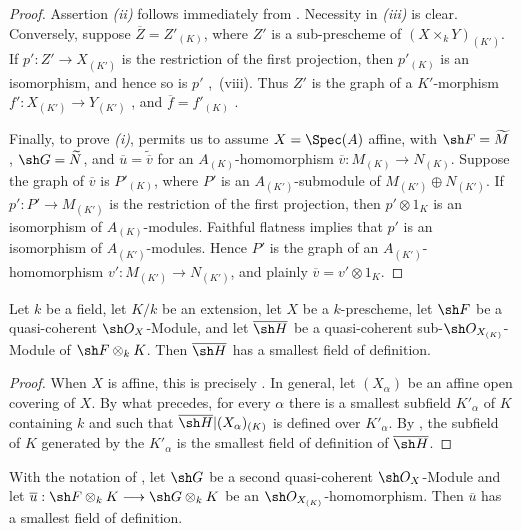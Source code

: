 \begin{proof}
Assertion \emph{(ii)} follows immediately from .
Necessity in \emph{(iii)} is clear.
Conversely, suppose
$\overline Z=Z'_{(K)}$, where $Z'$ is a sub-prescheme of
$(X\times_kY)_{(K')}$.
If $p':Z'\to X_{(K')}$ is the restriction of the first projection,
then $p'_{(K)}$ is an isomorphism, and hence so is $p'$
,~(viii).
Thus $Z'$ is the graph of a $K'$-morphism
$f':X_{(K')}\to Y_{(K')}$ , and
$\overline f=f'_{(K)}$ .

Finally, to prove \emph{(i)},  permits us to assume
$X=\Spec(A)$ affine, with $\sh F=\widetilde M$,
$\sh G=\widetilde N$, and
$\overline u=\widetilde{\overline v}$ for an
$A_{(K)}$-homomorphism
$\overline v:M_{(K)}\to N_{(K)}$.
Suppose the graph of $\overline v$ is
$P'_{(K)}$, where $P'$ is an $A_{(K')}$-submodule of
$M_{(K')}\oplus N_{(K')}$.
If $p':P'\to M_{(K')}$ is the restriction of the first projection,
then $p'\otimes1_K$ is an isomorphism of $A_{(K)}$-modules.
Faithful flatness  implies that $p'$ is an
isomorphism of $A_{(K')}$-modules.
Hence $P'$ is the graph of an $A_{(K')}$-homomorphism
$v':M_{(K')}\to N_{(K')}$, and plainly
$\overline v=v'\otimes1_K$.
\end{proof}

\begin{proposition}[4.8.9]
\label{IV.4.8.9}
Let $k$ be a field, let $K/k$ be an extension, let $X$ be a
$k$-prescheme, let $\sh F$ be a quasi-coherent $\sh O_X$-Module, and
let $\overline{\sh H}$ be a quasi-coherent
sub-$\sh O_{X_{(K)}}$-Module of
$\sh F\otimes_kK$.
Then $\overline{\sh H}$ has a smallest field of definition.
\end{proposition}

\begin{proof}
When $X$ is affine, this is precisely .
In general, let $(X_\alpha)$ be an affine open covering of $X$.
By what precedes, for every $\alpha$ there is a smallest subfield $K'_\alpha$ of $K$
containing $k$ and such that
$\overline{\sh H}|(X_\alpha)_{(K)}$ is defined over $K'_\alpha$.
By , the subfield of $K$ generated by the
$K'_\alpha$ is the smallest field of definition of $\overline{\sh H}$.
\end{proof}

\begin{corollary}[4.8.10]
\label{IV.4.8.10}
With the notation of , let $\sh G$ be a second
quasi-coherent $\sh O_X$-Module and let $\overline u:\sh F\otimes_kK\longrightarrow\sh G\otimes_kK$
be an $\sh O_{X_{(K)}}$-homomorphism.
Then $\overline u$ has a smallest field of definition.
\end{corollary}


